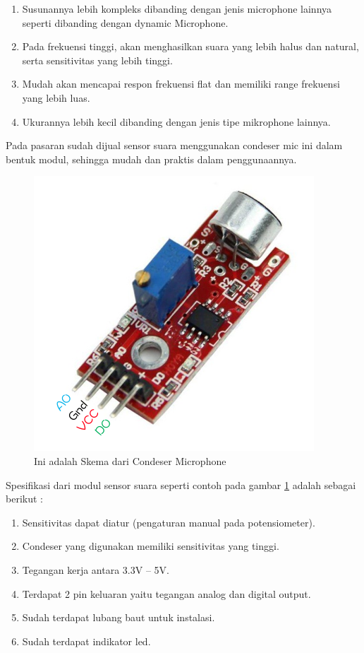 \begin{enumerate}
  \item Susunannya lebih kompleks dibanding dengan jenis microphone lainnya seperti dibanding dengan dynamic Microphone.
  \item Pada frekuensi tinggi, akan menghasilkan suara yang lebih halus dan natural, serta sensitivitas yang lebih tinggi.
  \item Mudah akan mencapai respon frekuensi flat dan memiliki range frekuensi yang lebih luas.
  \item Ukurannya lebih kecil dibanding dengan jenis tipe mikrophone lainnya.
\end{enumerate}

Pada pasaran sudah dijual sensor suara menggunakan condeser mic ini dalam bentuk modul, sehingga mudah dan praktis dalam penggunaannya.

\begin{figure}[!htbp]
  \centering
  \includegraphics[width=.75\textwidth]{figures/Arduino/sssensorsuara.png}
  \caption{Ini adalah Skema dari Condeser Microphone}\label{fig:sssensorsuara}
\end{figure}	

Spesifikasi dari modul sensor suara seperti contoh pada gambar \ref{fig:sssensorsuara} adalah sebagai berikut :

\begin{enumerate}
  \item Sensitivitas dapat diatur (pengaturan manual pada potensiometer).
  \item Condeser yang digunakan memiliki sensitivitas yang tinggi.
  \item Tegangan kerja antara 3.3V – 5V.
  \item Terdapat 2 pin keluaran yaitu tegangan analog dan digital output.
  \item Sudah terdapat lubang baut untuk instalasi.
  \item Sudah terdapat indikator led.
\end{enumerate} 

